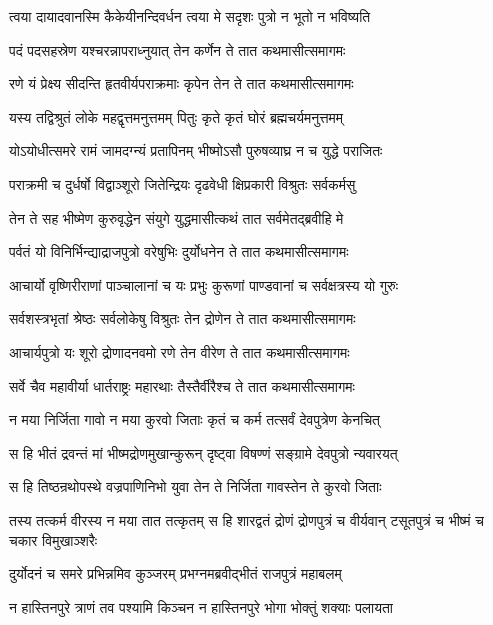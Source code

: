 \twolineshloka
{त्वया दायादवानस्मि कैकेयीनन्दिवर्धन}
{त्वया मे सदृशः पुत्रो न भूतो न भविष्यति}


\twolineshloka
{पदं पदसहस्रेण यश्चरन्नापराध्नुयात्}
{तेन कर्णेन ते तात कथमासीत्समागमः}


\twolineshloka
{रणे यं प्रेक्ष्य सीदन्ति हृतवीर्यपराक्रमाः}
{कृपेन तेन ते तात कथमासीत्समागमः}


\twolineshloka
{यस्य तद्विश्रुतं लोके महद्वृत्तमनुत्तमम्}
{पितुः कृते कृतं घोरं ब्रह्मचर्यमनुत्तमम्}


\twolineshloka
{योऽयोधीत्समरे रामं जामदग्न्यं प्रतापिनम्}
{भीष्मोऽसौ पुरुषव्याघ्र न च युद्धे पराजितः}


\twolineshloka
{पराक्रमी च दुर्धर्षो विद्वाञ्शूरो जितेन्द्रियः}
{दृढवेधी क्षिप्रकारी विश्रुतः सर्वकर्मसु}


\twolineshloka
{तेन ते सह भीष्मेण कुरुवृद्धेन संयुगे}
{युद्धमासीत्कथं तात सर्वमेतद्ब्रवीहि मे}


\twolineshloka
{पर्वतं यो विनिर्भिन्द्याद्राजपुत्रो वरेषुभिः}
{दुर्योधनेन ते तात कथमासीत्समागमः}


\twolineshloka
{आचार्यो वृष्णिरीराणां पाञ्चालानां च यः प्रभुः}
{कुरूणां पाण्डवानां च सर्वक्षत्रस्य यो गुरुः}


\twolineshloka
{सर्वशस्त्रभृतां श्रेष्ठः सर्वलोकेषु विश्रुतः}
{तेन द्रोणेन ते तात कथमासीत्समागमः}


\twolineshloka
{आचार्यपुत्रो यः शूरो द्रोणादनवमो रणे}
{तेन वीरेण ते तात कथमासीत्समागमः}


\twolineshloka
{सर्वे चैव महावीर्या धार्तराष्ट्रः महारथाः}
{तैस्तैर्वीरैश्च ते तात कथमासीत्समागमः}




\twolineshloka
{न मया निर्जिता गावो न मया कुरवो जिताः}
{कृतं च कर्म तत्सर्वं देवपुत्रेण केनचित्}


\twolineshloka
{स हि भीतं द्रवन्तं मां भीष्मद्रोणमुखान्कुरून्}
{दृष्ट्वा विषण्णं सङ्ग्रामे देवपुत्रो न्यवारयत्}


\twolineshloka
{स हि तिष्ठन्रथोपस्थे वज्रपाणिनिभो युवा}
{तेन ते निर्जिता गावस्तेन ते कुरवो जिताः}


\threelineshloka
{तस्य तत्कर्म वीरस्य न मया तात तत्कृतम्}
{स हि शारद्वतं द्रोणं द्रोणपुत्रं च वीर्यवान्}
{टसूतपुत्रं च भीष्मं च चकार विमुखाञ्शरैः}


\twolineshloka
{दुर्योदनं च समरे प्रभिन्नमिव कुञ्जरम्}
{प्रभग्नमब्रवीद्भीतं राजपुत्रं महाबलम्}


\twolineshloka
{न हास्तिनपुरे त्राणं तव पश्यामि किञ्चन}
{न हास्तिनपुरे भोगा भोक्तुं शक्याः पलायता}


